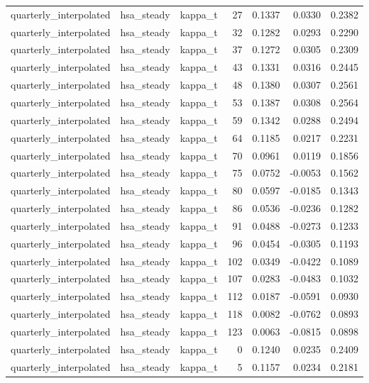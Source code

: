 \begin{tabular}{lllrrrr}
quarterly\_interpolated & hsa\_steady & kappa\_t & 27 & 0.1337 & 0.0330 & 0.2382 \\
quarterly\_interpolated & hsa\_steady & kappa\_t & 32 & 0.1282 & 0.0293 & 0.2290 \\
quarterly\_interpolated & hsa\_steady & kappa\_t & 37 & 0.1272 & 0.0305 & 0.2309 \\
quarterly\_interpolated & hsa\_steady & kappa\_t & 43 & 0.1331 & 0.0316 & 0.2445 \\
quarterly\_interpolated & hsa\_steady & kappa\_t & 48 & 0.1380 & 0.0307 & 0.2561 \\
quarterly\_interpolated & hsa\_steady & kappa\_t & 53 & 0.1387 & 0.0308 & 0.2564 \\
quarterly\_interpolated & hsa\_steady & kappa\_t & 59 & 0.1342 & 0.0288 & 0.2494 \\
quarterly\_interpolated & hsa\_steady & kappa\_t & 64 & 0.1185 & 0.0217 & 0.2231 \\
quarterly\_interpolated & hsa\_steady & kappa\_t & 70 & 0.0961 & 0.0119 & 0.1856 \\
quarterly\_interpolated & hsa\_steady & kappa\_t & 75 & 0.0752 & -0.0053 & 0.1562 \\
quarterly\_interpolated & hsa\_steady & kappa\_t & 80 & 0.0597 & -0.0185 & 0.1343 \\
quarterly\_interpolated & hsa\_steady & kappa\_t & 86 & 0.0536 & -0.0236 & 0.1282 \\
quarterly\_interpolated & hsa\_steady & kappa\_t & 91 & 0.0488 & -0.0273 & 0.1233 \\
quarterly\_interpolated & hsa\_steady & kappa\_t & 96 & 0.0454 & -0.0305 & 0.1193 \\
quarterly\_interpolated & hsa\_steady & kappa\_t & 102 & 0.0349 & -0.0422 & 0.1089 \\
quarterly\_interpolated & hsa\_steady & kappa\_t & 107 & 0.0283 & -0.0483 & 0.1032 \\
quarterly\_interpolated & hsa\_steady & kappa\_t & 112 & 0.0187 & -0.0591 & 0.0930 \\
quarterly\_interpolated & hsa\_steady & kappa\_t & 118 & 0.0082 & -0.0762 & 0.0893 \\
quarterly\_interpolated & hsa\_steady & kappa\_t & 123 & 0.0063 & -0.0815 & 0.0898 \\
quarterly\_interpolated & hsa\_steady & kappa\_t & 0 & 0.1240 & 0.0235 & 0.2409 \\
quarterly\_interpolated & hsa\_steady & kappa\_t & 5 & 0.1157 & 0.0234 & 0.2181 \\

\end{tabular}
